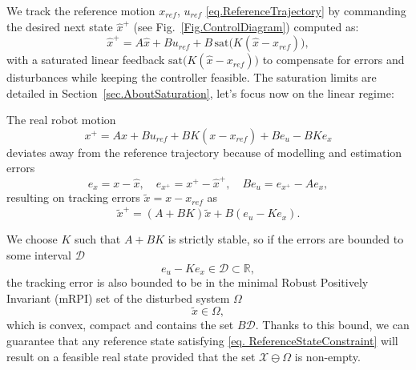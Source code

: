 \documentclass[letterpaper, 10 pt, conference]{ieeeconf}  %
\begin{document}
We track the reference motion $ x_\mathit{ref} $, $ u_\mathit{ref} $ \eqref{eq.ReferenceTrajectory} by commanding the desired next state $\hat{x}^+$ (see Fig.~\ref{Fig.ControlDiagram}) computed as:
\begin{equation}
    \hat{x}^{+} = A\hat{x} +Bu_\mathit{ref} + B\,\mathrm{sat}\big(K(\hat{x} - x_\mathit{ref})\big),
\end{equation}
%
with a saturated linear feedback $\mathrm{sat}\big(K(\hat{x} - x_\mathit{ref})\big)$ to compensate for errors and disturbances while keeping the controller feasible. The saturation limits are detailed in Section~\ref{sec.AboutSaturation}, let's focus now on the linear regime:

The real robot motion
\begin{equation}\label{eq.RealMotion}
   x^{+} = Ax + Bu_\mathit{ref}+BK(x-x_\mathit{ref}) + Be_{u} - BKe_{x}
\end{equation}
%
deviates away from the reference trajectory because of modelling and estimation errors
\begin{equation}
    e_x = x-\hat{x},\quad e_{x^{\texttt{+}}} = x^+\! -\hat{x}^+\!,\quad Be_u = e_{x^\texttt{+}} - Ae_x,
\end{equation}
%
resulting on tracking errors $\tilde{x} = x - x_\mathit{ref}$ as
\begin{equation}\label{eq.tr_error_dynamics}
    \tilde{x}^{+} = (A+BK)\tilde{x} + B(e_{u}-Ke_{x}).
\end{equation}

We choose $K$ such that $A+BK$ is strictly stable, so if the errors are bounded to some interval $\mathcal{D}$
%
\begin{equation}\label{eq.boundedDisturbances}
    e_{u}-Ke_{x} \in \mathcal{D} \subset \mathbb{R},
\end{equation}
%
the tracking error is also bounded to be in the minimal Robust Positively Invariant (mRPI) set of the disturbed system $\Omega$ \cite{Mrpi}
\begin{equation}
    \tilde{x} \in \Omega,
\end{equation}
%
which is convex, compact and contains the set $B\mathcal{D}$. Thanks to this bound, we can guarantee that any reference state satisfying \eqref{eq. ReferenceStateConstraint} will result on a feasible real state provided that the set $ \mathcal{X}\ominus \Omega $ is non-empty.
\end{document}
